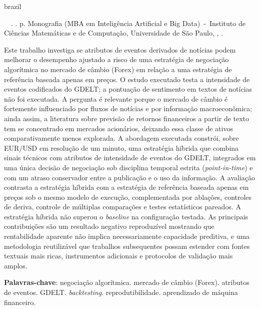 \setlength{\absparsep}{18pt}
\begin{resumo}[Resumo]
 \begin{otherlanguage*}{brazil}
    \begin{flushleft}
        \setlength{\absparsep}{0pt}
        \SingleSpacing
        \imprimirautorabr~~\textbf{\imprimirtituloresumo}.	\imprimirdata. \pageref{LastPage} p.
        Monografia (MBA em Intelig\^encia Artificial e Big Data)~-~Instituto de Ci\^encias Matem\'aticas e de Computa\c{c}\~ao, Universidade de S\~ao Paulo, \imprimirlocal, \imprimirdata.
    \end{flushleft}
    \OnehalfSpacing
    Este trabalho investiga se atributos de eventos derivados de not\'icias podem melhorar o desempenho ajustado a risco de uma estrat\'egia de negocia\c{c}\~ao algor\'itmica no mercado de c\^ambio (Forex) em rela\c{c}\~ao a uma estrat\'egia de refer\^encia baseada apenas em pre\c{c}os. O estudo executado testa a intensidade de eventos codificados do GDELT; a pontua\c{c}\~ao de sentimento em textos de not\'icias n\~ao foi executada. A pergunta \'e relevante porque o mercado de c\^ambio \'e fortemente influenciado por fluxos de not\'icias e por informa\c{c}\~ao macroecon\^omica; ainda assim, a literatura sobre previs\~ao de retornos financeiros a partir de texto tem se concentrado em mercados acion\'arios, deixando essa classe de ativos comparativamente menos explorada. A abordagem executada constr\'oi, sobre EUR/USD em resolu\c{c}\~ao de um minuto, uma estrat\'egia h\'ibrida que combina sinais t\'ecnicos com atributos de intensidade de eventos do GDELT, integrados em uma \'unica decis\~ao de negocia\c{c}\~ao sob disciplina temporal estrita (\emph{point-in-time}) e com um atraso conservador entre a publica\c{c}\~ao e o uso da informa\c{c}\~ao. A avalia\c{c}\~ao contrasta a estrat\'egia h\'ibrida com a estrat\'egia de refer\^encia baseada apenas em pre\c{c}os sob o mesmo modelo de execu\c{c}\~ao, complementada por abla\c{c}\~oes, controles de deriva, controle de m\'ultiplas compara\c{c}\~oes e testes estat\'isticos pareados. A estrat\'egia h\'ibrida n\~ao superou o \emph{baseline} na configura\c{c}\~ao testada. As principais contribui\c{c}\~oes s\~ao um resultado negativo reproduz\'ivel mostrando que rentabilidade aparente n\~ao implica necessariamente capacidade preditiva, e uma metodologia reutiliz\'avel que trabalhos subsequentes possam estender com fontes textuais mais ricas, instrumentos adicionais e protocolos de valida\c{c}\~ao mais amplos.

    \noindent
    \textbf{Palavras-chave}: negocia\c{c}\~ao algor\'itmica. mercado de c\^ambio (Forex). atributos de eventos. GDELT. \emph{backtesting}. reprodutibilidade. aprendizado de m\'aquina financeiro.
 \end{otherlanguage*}
\end{resumo}
